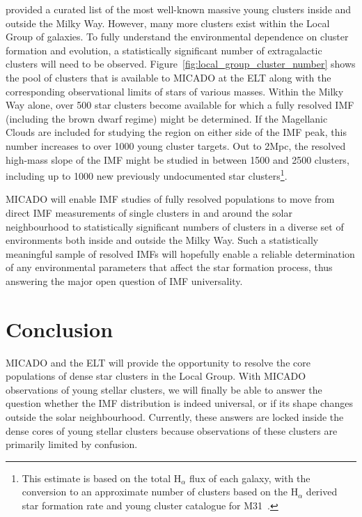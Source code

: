\documentclass{aa}
\begin{document}
\citet{portegies2010} provided a curated list of the most well-known massive young clusters inside and outside the Milky Way.
However, many more clusters exist within the Local Group of galaxies.
To fully understand the environmental dependence on cluster formation and evolution, a statistically significant number of extragalactic clusters will need to be observed.
Figure~\ref{fig:local_group_cluster_number} shows the pool of clusters that is available to MICADO at the ELT along with the corresponding observational limits of stars of various masses.
Within the Milky Way alone, over 500 star clusters become available for which a fully resolved IMF (including the brown dwarf regime) might be determined.
If the Magellanic Clouds are included for studying the region on either side of the IMF peak, this number increases to over 1000 young cluster targets.
Out to 2Mpc, the resolved high-mass slope of the IMF might be studied in between 1500 and 2500 clusters, including up to 1000 new previously undocumented star clusters\footnote{This estimate is based on the total H$_\alpha$ flux of each galaxy, with the conversion to an approximate number of clusters based on the H$_\alpha$ derived star formation rate and young cluster catalogue for M31~\citep{caldwell09}.}.

MICADO will enable IMF studies of fully resolved populations to move from direct IMF measurements of single clusters in and around the solar neighbourhood to statistically significant numbers of clusters in a diverse set of environments both inside and outside the Milky Way.
Such a statistically meaningful sample of resolved IMFs will hopefully enable a reliable determination of any environmental parameters that affect the star formation process, thus answering the major open question of IMF universality.




\section{Conclusion}
\label{sec:conclusion}

MICADO and the ELT will provide the opportunity to resolve the core populations of dense star clusters in the Local Group.
With MICADO observations of young stellar clusters, we will finally be able to answer the question whether the IMF distribution is indeed universal, or if its shape changes outside the solar neighbourhood.
Currently, these answers are locked inside the dense cores of young stellar clusters because observations of these clusters are primarily limited by confusion.
\end{document}

